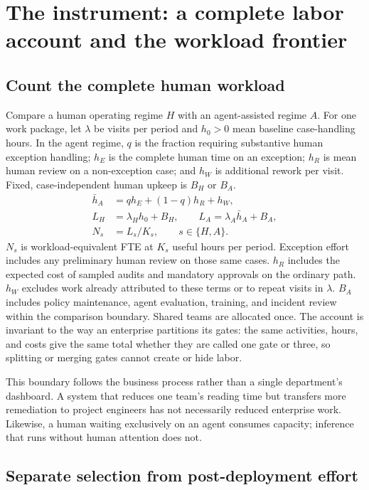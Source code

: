 \section{The instrument: a complete labor account and the workload frontier}
\label{sec:frontier}

\subsection{Count the complete human workload}

Compare a human operating regime $H$ with an agent-assisted regime $A$. For one work package, let
$\lambda$ be visits per period and $h_0>0$ mean baseline case-handling hours. In the agent regime,
$q$ is the fraction requiring substantive human exception handling; $h_E$ is the complete human time
on an exception; $h_R$ is mean human review on a non-exception case; and $h_W$ is additional rework
per visit. Fixed, case-independent human upkeep is $B_H$ or $B_A$.
\begin{align}
\bar h_A &= q h_E + (1-q) h_R + h_W, \label{eq:hbar}\\
L_H &= \lambda_H h_0 + B_H, \qquad L_A = \lambda_A \bar h_A + B_A, \label{eq:hours}\\
N_s &= L_s / K_s, \qquad s\in\{H,A\}. \label{eq:fte}
\end{align}
$N_s$ is workload-equivalent FTE at $K_s$ useful hours per period. Exception effort includes any
preliminary human review on those same cases. $h_R$ includes the expected cost of sampled audits
and mandatory approvals on the ordinary path. $h_W$ excludes work already attributed to these
terms or to repeat visits in $\lambda$. $B_A$ includes policy maintenance, agent evaluation, training,
and incident review within the comparison boundary. Shared teams are allocated once. The
account is invariant to the way an enterprise partitions its gates: the same activities, hours, and
costs give the same total whether they are called one gate or three, so splitting or merging gates
cannot create or hide labor.

This boundary follows the business process rather than a single department's dashboard. A system
that reduces one team's reading time but transfers more remediation to project engineers
has not necessarily reduced enterprise work. Likewise, a human waiting exclusively on an agent
consumes capacity; inference that runs without human attention does not.

\subsection{Separate selection from post-deployment effort}
\label{sec:selection}

